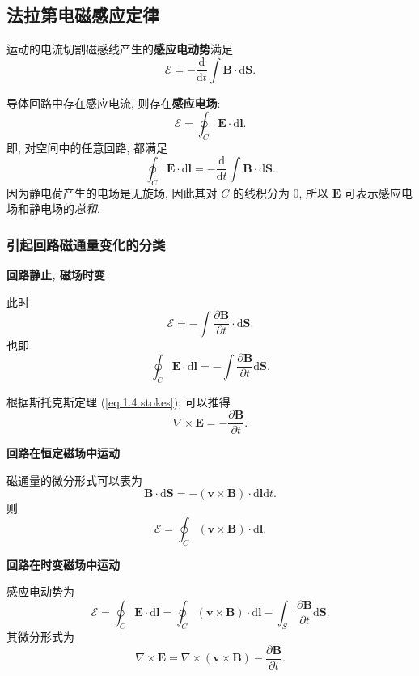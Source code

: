 \subsection{法拉第电磁感应定律}
运动的电流切割磁感线产生的\textbf{感应电动势}满足
\begin{equation}
    \mathcal{E}=-\frac{\mathrm{d}}{\mathrm{d}t}\int\bm{B}\cdot\mathrm{d}\bm{S}.
\end{equation}

导体回路中存在感应电流, 则存在\textbf{感应电场}:
\begin{equation}
    \mathcal{E}=\oint_C\bm{E}\cdot\mathrm{d}\bm{l}.
\end{equation}
即, 对空间中的任意回路, 都满足
\begin{equation}
    \oint_C\bm{E}\cdot\mathrm{d}\bm{l}=-\frac{\mathrm{d}}{\mathrm{d}t}\int\bm{B}\cdot\mathrm{d}\bm{S}.
\end{equation}
因为静电荷产生的电场是无旋场, 因此其对 $C$ 的线积分为 0, 所以 $\bm{E}$ 可表示感应电场和静电场的\textit{总和}.

\subsubsection{引起回路磁通量变化的分类}
\textbf{回路静止, 磁场时变}

此时
\begin{equation}
    \mathcal{E}=-\int\frac{\partial\bm{B}}{\partial t}\cdot\mathrm{d}\bm{S}.
\end{equation}
也即
\begin{equation}
    \oint_C\bm{E}\cdot\mathrm{d}\bm{l}=-\int\frac{\partial\bm{B}}{\partial t}\mathrm{d}\bm{S}.
\end{equation}

根据斯托克斯定理 (\ref{eq:1.4 stokes}), 可以推得
\begin{equation}
    \nabla\times\bm{E}=-\frac{\partial\bm{B}}{\partial t}.
\end{equation}

\textbf{回路在恒定磁场中运动}

磁通量的微分形式可以表为
\begin{equation}
    \bm{B}\cdot\mathrm{d}\bm{S}=-(\bm{v}\times\bm{B})\cdot\mathrm{d}\bm{l}\mathrm{d}t.
\end{equation}
则
\begin{equation}
    \mathcal{E}=\oint_C(\bm{v}\times\bm{B})\cdot\mathrm{d}\bm{l}.
\end{equation}

\textbf{回路在时变磁场中运动}

感应电动势为
\begin{equation}
    \mathcal{E}=\oint_C\bm{E}\cdot\mathrm{d}\bm{l}=\oint_C(\bm{v}\times\bm{B})\cdot\mathrm{d}\bm{l}-\int_S\frac{\partial\bm{B}}{\partial t}\mathrm{d}\bm{S}.
\end{equation}
其微分形式为
\begin{equation}
    \nabla\times\bm{E}=\nabla\times(\bm{v}\times\bm{B})-\frac{\partial\bm{B}}{\partial t}.
\end{equation}
